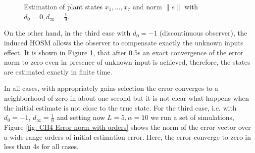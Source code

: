 \documentclass[11pt,letterpaper,twoside,openright]{report}
\providecommand{\norm}[1]{\lVert#1\rVert}
\begin{document}
\begin{figure}[htbp]
	\caption{Estimation of plant states $x_1,...,x_7$ and norm  $\norm{e}$ with $d_0=0,d_{\infty}=\tfrac{1}{9}$.}
	\label{fig: CH4 Error states and norm, e_0 disc}
\end{figure}

On the other hand, in the third case with $d_0=-1$ (discontinuous observer), the induced HOSM  allows the observer to compensate exactly the unknown inputs effect. It is shown in Figure \ref{fig: CH4 Error states and norm, e_0 disc}, that after 0.5s an exact convergence of the error norm to zero even in presence of unknown input is achieved, therefore, the states are estimated exactly in finite time.

In all cases, with appropriately gains selection the error converges to a neighborhood of zero in about one second but it is not clear what happens when the initial estimate is not close to the true state. For the third case, i.e. with $d_0=-1$, $d_{\infty}=\tfrac{1}{9}$ and setting now $L=5,\alpha=10$ we run a set of simulations, Figure \ref{fig: CH4 Error norm with orders} shows the norm of the error vector over a wide range orders of initial estimation error. Here, the error converge to zero in less than 4s for all cases.
\end{document}
